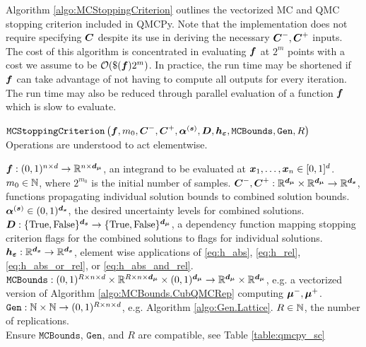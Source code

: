 \documentclass{article}[12pt]
\begin{document}
Algorithm \ref{algo:MCStoppingCriterion} outlines the vectorized MC and QMC stopping criterion included in QMCPy. Note that the implementation does not require specifying $\bC$ despite its use in deriving the necessary $\bC^-,\bC^+$ inputs. The cost of this algorithm is concentrated in evaluating $\bf$ at $2^m$ points with a cost we assume to be $\calO(\$(\bf)2^m)$. In practice, the run time may be shortened if $\bf$ can take advantage of not having to compute all outputs for every iteration. The run time may also be reduced through parallel evaluation of a function $\bf$ which is slow to evaluate. %

\begin{algorithm}[h!]
    \caption{$\texttt{MCStoppingCriterion}\left(\bf,m_0,\bC^-,\bC^+,\balpha^{(\bs)}, \bD, \bh_{\bvarepsilon}, \texttt{MCBounds}, \texttt{Gen}, R \right)$ \\ Operations are understood to act elementwise.}
    \label{algo:MCStoppingCriterion}
    \begin{algorithmic}
    \Require $\bf: (0,1)^{n \times {d}} \to \bbR^{n \times \bd_{\bmu}}$, an integrand to be evaluated at $\bx_1,\dots,\bx_n \in [0,1]^{d}$.
    \Require $m_0 \in \bbN$, where $2^{m_0}$ is the initial number of samples.
    \Require $\bC^-,\bC^+: \bbR^{\bd_{\bmu}} \times \bbR^{\bd_{\bmu}} \to \bbR^{\bd_{\bs}}$, functions propagating individual solution bounds to combined solution bounds.
    \Require $\balpha^{(\bs)} \in (0,1)^{\bd_{\bs}}$, the desired uncertainty levels for combined solutions.
    \Require $\bD: \tfset^{\bd_{\bs}} \to \tfset^{\bd_{\bmu}}$, a dependency function mapping stopping criterion flags for the combined solutions to flags for individual solutions. 
    \Require $\bh_{\bvarepsilon}: \bbR^{\bd_{\bs}} \to \bbR^{\bd_{\bs}}$, element wise applications of \eqref{eq:h_abs}, \eqref{eq:h_rel}, \eqref{eq:h_abs_or_rel}, or \eqref{eq:h_abs_and_rel}. 
    \Require $\texttt{MCBounds}: (0,1)^{R \times n \times d} \times \bbR^{R \times n \times \bd_{\bmu}} \times (0,1)^{\bd_{\bmu}} \to \bbR^{\bd_{\bmu}} \times \bbR^{\bd_{\bmu}}$, e.g. a vectorized version of Algorithm \ref{algo:MCBounds.CubQMCRep} computing $\bmu^-,\bmu^+$.
    \Require $\texttt{Gen}: \bbN \times \bbN \to (0,1)^{R \times n \times d}$, e.g. Algorithm \ref{algo:Gen.Lattice}. 
    \Require $R \in \bbN$, the number of replications.
    \\ \hrulefill
    \State Ensure $\texttt{MCBounds}$, $\texttt{Gen}$, and $R$ are compatible, see Table \ref{table:qmcpy_sc}

\end{algorithmic}
\end{algorithm}
\end{document}
